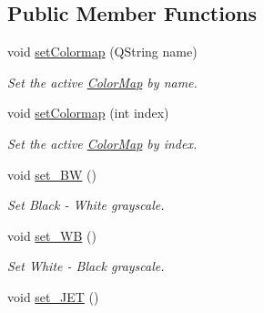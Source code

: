 \subsection*{Public Member Functions}
\begin{DoxyCompactItemize}
\item 
\mbox{\label{classViewer_1_1ColorMap_a96bf84d0330588969e2dfd08312159d7}} 
void \mbox{\hyperlink{classViewer_1_1ColorMap_a96bf84d0330588969e2dfd08312159d7}{set\+Colormap}} (Q\+String name)
\begin{DoxyCompactList}\small\item\em Set the active \mbox{\hyperlink{classViewer_1_1ColorMap}{Color\+Map}} by name. \end{DoxyCompactList}\item 
\mbox{\label{classViewer_1_1ColorMap_af5d66615f319e77c79fd6ed6a4df7ea4}} 
void \mbox{\hyperlink{classViewer_1_1ColorMap_af5d66615f319e77c79fd6ed6a4df7ea4}{set\+Colormap}} (int index)
\begin{DoxyCompactList}\small\item\em Set the active \mbox{\hyperlink{classViewer_1_1ColorMap}{Color\+Map}} by index. \end{DoxyCompactList}\item 
\mbox{\label{classViewer_1_1ColorMap_a20586fb34a373264c9948ed70fb4f8c2}} 
void \mbox{\hyperlink{classViewer_1_1ColorMap_a20586fb34a373264c9948ed70fb4f8c2}{set\+\_\+\+BW}} ()
\begin{DoxyCompactList}\small\item\em Set Black -\/ White grayscale. \end{DoxyCompactList}\item 
\mbox{\label{classViewer_1_1ColorMap_a73653a443aa595f23a48aa03c17e7071}} 
void \mbox{\hyperlink{classViewer_1_1ColorMap_a73653a443aa595f23a48aa03c17e7071}{set\+\_\+\+WB}} ()
\begin{DoxyCompactList}\small\item\em Set White -\/ Black grayscale. \end{DoxyCompactList}\item 
\mbox{\label{classViewer_1_1ColorMap_a1f56d2420ac2c69688711c70ec3a201c}} 
void \mbox{\hyperlink{classViewer_1_1ColorMap_a1f56d2420ac2c69688711c70ec3a201c}{set\+\_\+\+J\+ET}} ()

\end{DoxyCompactItemize}
